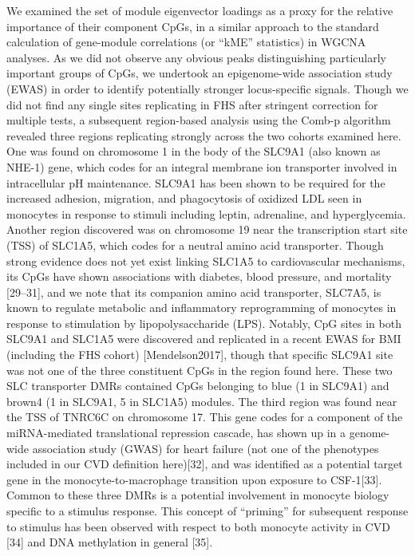 \documentclass[]{article}
\theoremstyle{definition}
\theoremstyle{definition}
\theoremstyle{definition}
\theoremstyle{remark}
\begin{document}
We examined the set of module eigenvector loadings as a proxy for the
relative importance of their component CpGs, in a similar approach to
the standard calculation of gene-module correlations (or ``kME''
statistics) in WGCNA analyses. As we did not observe any obvious peaks
distinguishing particularly important groups of CpGs, we undertook an
epigenome-wide association study (EWAS) in order to identify potentially
stronger locus-specific signals. Though we did not find any single sites
replicating in FHS after stringent correction for multiple tests, a
subsequent region-based analysis using the Comb-p algorithm revealed
three regions replicating strongly across the two cohorts examined here.
One was found on chromosome 1 in the body of the SLC9A1 (also known as
NHE-1) gene, which codes for an integral membrane ion transporter
involved in intracellular pH maintenance. SLC9A1 has been shown to be
required for the increased adhesion, migration, and phagocytosis of
oxidized LDL seen in monocytes in response to stimuli including leptin,
adrenaline, and hyperglycemia. Another region discovered was on
chromosome 19 near the transcription start site (TSS) of SLC1A5, which
codes for a neutral amino acid transporter. Though strong evidence does
not yet exist linking SLC1A5 to cardiovascular mechanisms, its CpGs have
shown associations with diabetes, blood pressure, and mortality
{[}29--31{]}, and we note that its companion amino acid transporter,
SLC7A5, is known to regulate metabolic and inflammatory reprogramming of
monocytes in response to stimulation by lipopolysaccharide (LPS).
Notably, CpG sites in both SLC9A1 and SLC1A5 were discovered and
replicated in a recent EWAS for BMI (including the FHS cohort)
{[}Mendelson2017{]}, though that specific SLC9A1 site was not one of the
three constituent CpGs in the region found here. These two SLC
transporter DMRs contained CpGs belonging to blue (1 in SLC9A1) and
brown4 (1 in SLC9A1, 5 in SLC1A5) modules. The third region was found
near the TSS of TNRC6C on chromosome 17. This gene codes for a component
of the miRNA-mediated translational repression cascade, has shown up in
a genome-wide association study (GWAS) for heart failure (not one of the
phenotypes included in our CVD definition here){[}32{]}, and was
identified as a potential target gene in the monocyte-to-macrophage
transition upon exposure to CSF-1{[}33{]}. Common to these three DMRs is
a potential involvement in monocyte biology specific to a stimulus
response. This concept of ``priming'' for subsequent response to
stimulus has been observed with respect to both monocyte activity in CVD
{[}34{]} and DNA methylation in general {[}35{]}.
\end{document}
